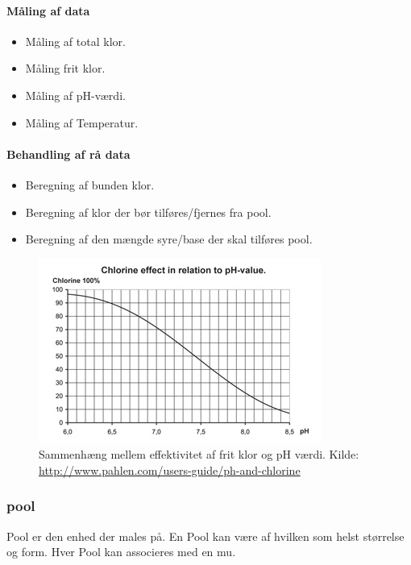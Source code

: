 \paragraph{Måling af data}
\begin{itemize}
	\item Måling af total klor.
	\item Måling frit klor.
	\item Måling af pH-værdi.
	\item Måling af Temperatur.
\end{itemize}

\paragraph{Behandling af rå data}
\begin{itemize}
	\item Beregning af bunden klor.
	\item Beregning af klor der bør tilføres/fjernes fra \gls{pool}.
	\item Beregning af den mængde syre/base der skal tilføres \gls{pool}.
\end{itemize}

\begin{figure}
	\centering
	\includegraphics[width=0.7\linewidth]{figs/chlorinePh.png}
	\caption{Sammenhæng mellem effektivitet af frit klor og pH værdi. Kilde: \url{http://www.pahlen.com/users-guide/ph-and-chlorine}}
	\label{fig:chlorinePh}
\end{figure}


\subsubsection{\gls{pool}}
Pool er den enhed der males på. En Pool kan være af hvilken som helst størrelse og form. Hver Pool kan associeres med en \gls{mu}.